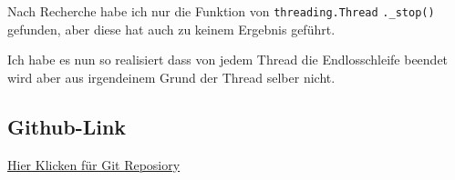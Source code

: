 Nach Recherche habe ich nur die Funktion von \verb|threading.Thread| \verb|._stop()| gefunden, aber diese hat auch zu keinem Ergebnis geführt.

Ich habe es nun so realisiert dass von jedem Thread die Endlosschleife beendet wird aber aus irgendeinem Grund der Thread selber nicht.  

\subsection{Github-Link}

\hyperlink{https://github.com/mwoelfer-tgm/sew1617/tree/master/thread_queues}{Hier Klicken für Git Reposiory}